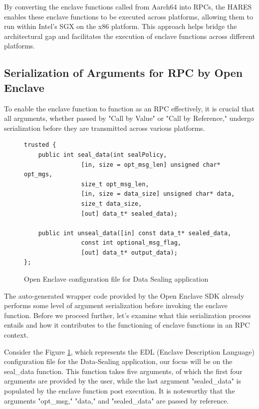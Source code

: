 \documentclass[article, doublespace,nopageskip]{VTthesis} %
\newcommand{\monitor}{HARES }
\begin{document}
    By converting the enclave functions called from Aarch64 into RPCs, the \monitor enables these enclave functions to be executed across platforms, allowing them to run within Intel's SGX on the x86 platform. This approach helps bridge the architectural gap and facilitates the execution of enclave functions across different platforms. 

    \subsection{Serialization of Arguments for RPC by Open Enclave}
    To enable the enclave function to function as an RPC effectively, it is crucial that all arguments, whether passed by "Call by Value" or "Call by Reference," undergo serialization before they are transmitted across various platforms.

    \begin{figure}
    \begin{tcolorbox}
    \begin{verbatim}
trusted {
    public int seal_data(int sealPolicy,
                [in, size = opt_msg_len] unsigned char* opt_mgs,
                size_t opt_msg_len,
                [in, size = data_size] unsigned char* data,
                size_t data_size,
                [out] data_t* sealed_data);

    public int unseal_data([in] const data_t* sealed_data,
                const int optional_msg_flag,
                [out] data_t* output_data);
};
    \end{verbatim}
    \end{tcolorbox}
    \caption{Open Enclave configuration file for Data Sealing application}
    \label{fig:Data Sealing oe config}
    \end{figure}
    
    The auto-generated wrapper code provided by the Open Enclave SDK already performs
    some level of argument serialization before invoking the enclave function. Before we proceed further, let’s examine what this serialization process entails and how it contributes to the functioning of enclave functions in an RPC context.

    Consider the Figure \ref{fig:Data Sealing oe config}, which represents the EDL (Enclave Description Language) configuration file for the Data-Sealing application, our focus will be on the seal\_data function. This function takes five arguments, of which the first four arguments are provided by the user, while the last argument "sealed\_data" is populated by the enclave function post execution. It is noteworthy that the arguments "opt\_msg," "data," and "sealed\_data" are passed by reference.
\end{document}
